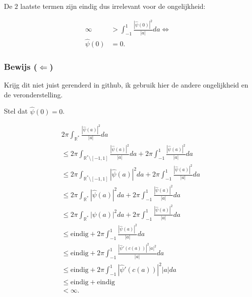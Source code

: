 \documentclass{article}
\begin{document}
De $2$ laatste termen zijn eindig dus irrelevant voor de ongelijkheid:

\begin{align*}
    \infty            & > \int_{-1}^{1} \frac{|\widehat{\psi}(0)|^{2}}{|a|} da \Leftrightarrow \\
    \widehat{\psi}(0) & =0
    .
\end{align*}

\subsubsection{Bewijs ($\Leftarrow$)}

Krijg dit niet juist gerenderd in github, ik gebruik hier de andere ongelijkheid en de veronderstelling.

Stel dat $\widehat{\psi}(0) =0$.

\begin{align*}
     & 2\pi \int_{\mathbb{R}^*} \frac{|\widehat{\psi}(a)|^{2} }{|a|} da                                                                                    \\
     & \le 2 \pi \int_{\mathbb{R}^* \setminus [-1,1]} \frac{|\widehat{\psi}(a)|^{2} }{|a|} da +2 \pi \int_{-1}^{1} \frac{|\widehat{\psi}(a)|^{2} }{|a|} da \\
     & \le 2 \pi \int_{\mathbb{R}^* \setminus [-1,1]} |\widehat{\psi}(a)|^{2} da +2 \pi \int_{-1}^{1} \frac{|\widehat{\psi}(a)|^{2} }{|a|} da              \\
     & \le 2 \pi \int_{\mathbb{R}^* } |\widehat{\psi}(a)|^{2} da +2 \pi \int_{-1}^{1} \frac{|\widehat{\psi}(a)|^{2} }{|a|} da                              \\
     & \le 2 \pi \int_{\mathbb{R}^* } |\psi(a)|^{2} da +2 \pi \int_{-1}^{1} \frac{|\widehat{\psi}(a)|^{2} }{|a|} da                                        \\
     & \le \text{eindig} +2 \pi \int_{-1}^{1} \frac{|\widehat{\psi}(a)|^{2} }{|a|} da                                                                      \\
     & \le \text{eindig} +2 \pi \int_{-1}^{1} \frac{|\widehat{\psi}'(c(a))|^{2} |a|^{2} }{|a|} da                                                          \\
     & \le \text{eindig} +2 \pi \int_{-1}^{1} |\widehat{\psi}'(c(a))|^{2} |a| da                                                                           \\
     & \le \text{eindig} + \text{eindig}                                                                                                                   \\
     & < \infty.
\end{align*}
\end{document}
